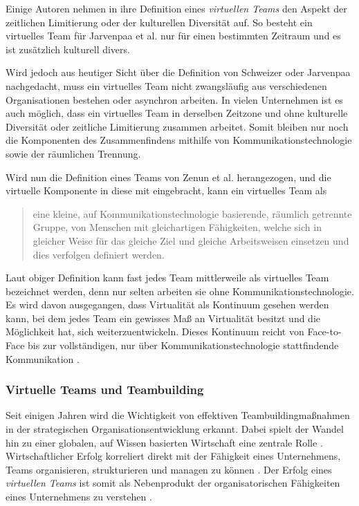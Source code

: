 \documentclass[a4paper,11pt]{article}%
\renewcommand{\\}{\vspace*{0.5\baselineskip} \newline}
\begin{document}
Einige Autoren nehmen in ihre Definition eines \textit{virtuellen Teams} den Aspekt der zeitlichen Limitierung oder der kulturellen Diversität auf. So besteht ein virtuelles Team für Jarvenpaa et al. \citep[S.1-2]{jarvenpaa1999communication} nur für einen bestimmten Zeitraum und es ist zusätzlich kulturell divers. 

Wird jedoch aus heutiger Sicht über die Definition von Schweizer oder Jarvenpaa nachgedacht, muss ein virtuelles Team nicht zwangsläufig aus verschiedenen Organisationen bestehen oder asynchron arbeiten. In vielen Unternehmen ist es auch möglich, dass ein virtuelles Team in derselben Zeitzone und ohne kulturelle Diversität oder zeitliche Limitierung zusammen arbeitet.
Somit bleiben nur noch die Komponenten des Zusammenfindens mithilfe von Kommunikationstechnologie sowie der räumlichen Trennung.

Wird nun die Definition eines Teams von Zenun et al. \citep[S.2]{zenun2007effects} herangezogen, und die virtuelle Komponente in diese mit eingebracht, kann ein virtuelles Team als
\begin{quote}
\glqq{}eine kleine, auf Kommunikationstechnologie basierende, räumlich getrennte Gruppe, von Menschen mit gleichartigen Fähigkeiten, welche sich in gleicher Weise für das gleiche Ziel und gleiche Arbeitsweisen einsetzen und dies verfolgen\dq{} \\
definiert werden.
\end{quote}

Laut obiger Definition kann fast jedes Team mittlerweile als virtuelles Team bezeichnet werden, denn nur selten arbeiten sie ohne Kommunikationstechnologie. 
Es wird davon ausgegangen, dass Virtualität als Kontinuum gesehen werden kann, bei dem jedes Team ein gewisses Maß an Virtualität besitzt und die Möglichkeit hat, sich weiterzuentwickeln. Dieses Kontinuum reicht von Face-to-Face bis zur vollständigen, nur über Kommunikationstechnologie stattfindende Kommunikation \citep{martins2004virtual}.
\subsubsection{Virtuelle Teams und Teambuilding}

Seit einigen Jahren wird die Wichtigkeit von effektiven Teambuildingmaßnahmen in der strategischen Organisationsentwicklung erkannt. Dabei spielt der Wandel hin zu einer globalen, auf Wissen basierten Wirtschaft eine zentrale Rolle \citep{belbin2011management} \citep[S.7]{katzenbach2015wisdom}.
Wirtschaftlicher Erfolg korreliert direkt mit der Fähigkeit eines Unternehmens, Teams organisieren, strukturieren und managen zu können \citep{pasmore1993designing}.
Der Erfolg eines \textit{virtuellen Teams} ist somit als Nebenprodukt der organisatorischen Fähigkeiten eines Unternehmens zu verstehen \citep[S.5]{kling1994social}.
\end{document}
